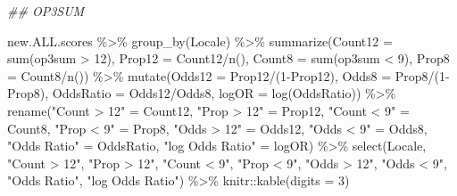 \documentclass[
  letterpaper,
  DIV=11,
  numbers=noendperiod]{scrartcl}
\newenvironment{Shaded}{\begin{snugshade}}{\end{snugshade}}
\newcommand{\AttributeTok}[1]{\textcolor[rgb]{0.40,0.45,0.13}{#1}}
\newcommand{\DecValTok}[1]{\textcolor[rgb]{0.68,0.00,0.00}{#1}}
\newcommand{\DocumentationTok}[1]{\textcolor[rgb]{0.37,0.37,0.37}{\textit{#1}}}
\newcommand{\FunctionTok}[1]{\textcolor[rgb]{0.28,0.35,0.67}{#1}}
\newcommand{\NormalTok}[1]{\textcolor[rgb]{0.00,0.23,0.31}{#1}}
\newcommand{\OtherTok}[1]{\textcolor[rgb]{0.00,0.23,0.31}{#1}}
\newcommand{\SpecialCharTok}[1]{\textcolor[rgb]{0.37,0.37,0.37}{#1}}
\newcommand{\StringTok}[1]{\textcolor[rgb]{0.13,0.47,0.30}{#1}}
\begin{document}
\begin{Shaded}
\begin{Highlighting}[]
\DocumentationTok{\#\# OP3SUM}

\NormalTok{new.ALL.scores }\SpecialCharTok{\%\textgreater{}\%}
  \FunctionTok{group\_by}\NormalTok{(Locale) }\SpecialCharTok{\%\textgreater{}\%}
  \FunctionTok{summarize}\NormalTok{(}\AttributeTok{Count12 =} \FunctionTok{sum}\NormalTok{(op3sum }\SpecialCharTok{\textgreater{}} \DecValTok{12}\NormalTok{),}
            \AttributeTok{Prop12 =}\NormalTok{ Count12}\SpecialCharTok{/}\FunctionTok{n}\NormalTok{(),}
            \AttributeTok{Count8 =} \FunctionTok{sum}\NormalTok{(op3sum }\SpecialCharTok{\textless{}} \DecValTok{9}\NormalTok{),}
            \AttributeTok{Prop8 =}\NormalTok{ Count8}\SpecialCharTok{/}\FunctionTok{n}\NormalTok{()) }\SpecialCharTok{\%\textgreater{}\%}
  \FunctionTok{mutate}\NormalTok{(}\AttributeTok{Odds12 =}\NormalTok{ Prop12}\SpecialCharTok{/}\NormalTok{(}\DecValTok{1}\SpecialCharTok{{-}}\NormalTok{Prop12),}
         \AttributeTok{Odds8 =}\NormalTok{ Prop8}\SpecialCharTok{/}\NormalTok{(}\DecValTok{1}\SpecialCharTok{{-}}\NormalTok{Prop8),}
         \AttributeTok{OddsRatio =}\NormalTok{ Odds12}\SpecialCharTok{/}\NormalTok{Odds8,}
         \AttributeTok{logOR =} \FunctionTok{log}\NormalTok{(OddsRatio)) }\SpecialCharTok{\%\textgreater{}\%}
  \FunctionTok{rename}\NormalTok{(}\StringTok{"Count \textgreater{} 12"} \OtherTok{=}\NormalTok{ Count12,}
         \StringTok{"Prop \textgreater{} 12"} \OtherTok{=}\NormalTok{ Prop12,}
         \StringTok{"Count \textless{} 9"} \OtherTok{=}\NormalTok{ Count8,}
         \StringTok{"Prop \textless{} 9"} \OtherTok{=}\NormalTok{ Prop8,}
         \StringTok{"Odds \textgreater{} 12"} \OtherTok{=}\NormalTok{ Odds12,}
         \StringTok{"Odds \textless{} 9"} \OtherTok{=}\NormalTok{ Odds8,}
         \StringTok{"Odds Ratio"} \OtherTok{=}\NormalTok{ OddsRatio,}
         \StringTok{"log Odds Ratio"} \OtherTok{=}\NormalTok{ logOR) }\SpecialCharTok{\%\textgreater{}\%}
  \FunctionTok{select}\NormalTok{(Locale, }\StringTok{"Count \textgreater{} 12"}\NormalTok{, }\StringTok{"Prop \textgreater{} 12"}\NormalTok{, }\StringTok{"Count \textless{} 9"}\NormalTok{, }\StringTok{"Prop \textless{} 9"}\NormalTok{, }\StringTok{"Odds \textgreater{} 12"}\NormalTok{, }\StringTok{"Odds \textless{} 9"}\NormalTok{, }\StringTok{"Odds Ratio"}\NormalTok{, }\StringTok{"log Odds Ratio"}\NormalTok{) }\SpecialCharTok{\%\textgreater{}\%}
\NormalTok{  knitr}\SpecialCharTok{::}\FunctionTok{kable}\NormalTok{(}\AttributeTok{digits =} \DecValTok{3}\NormalTok{)}
\end{Highlighting}
\end{Shaded}
\end{document}
